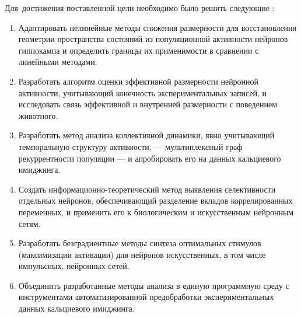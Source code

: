 Для~достижения поставленной цели необходимо было решить следующие {\tasks}:
\begin{enumerate}[beginpenalty=10000]
  \item Адаптировать нелинейные методы снижения размерности для восстановления
  геометрии пространства состояний из популяционной активности нейронов
  гиппокампа и определить границы их применимости в сравнении с линейными
  методами.
  \item Разработать алгоритм оценки эффективной размерности нейронной
  активности, учитывающий конечность экспериментальных записей, и исследовать
  связь эффективной и внутренней размерности с поведением животного.
  \item Разработать метод анализа коллективной динамики, явно учитывающий
  темпоральную структуру активности, --- мультиплексный граф рекуррентности
  популяции --- и апробировать его на данных кальциевого имиджинга.
  \item Создать информационно-теоретический метод выявления селективности
  отдельных нейронов, обеспечивающий разделение вкладов коррелированных
  переменных, и применить его к биологическим и искусственным нейронным сетям.
  \item Разработать безградиентные методы синтеза оптимальных стимулов
  (максимизации активации) для нейронов искусственных, в том числе импульсных,
  нейронных сетей.
  \item Объединить разработанные методы анализа в единую программную среду
  с инструментами автоматизированной предобработки экспериментальных данных
  кальциевого имиджинга.
\end{enumerate}


